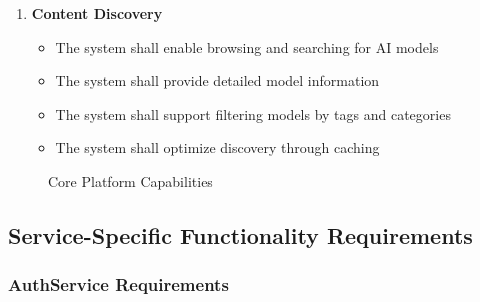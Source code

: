 \begin{enumerate}
   \item \textbf{Content Discovery}
   \begin{itemize}
      \item The system shall enable browsing and searching for AI models
      \item The system shall provide detailed model information
      \item The system shall support filtering models by tags and categories
      \item The system shall optimize discovery through caching
   \end{itemize}
\end{enumerate}

\begin{figure}
    \centering
    \caption{Core Platform Capabilities}
    \label{fig:platform-capabilities}
\end{figure}

\subsection{Service-Specific Functionality Requirements}

\subsubsection*{AuthService Requirements}

